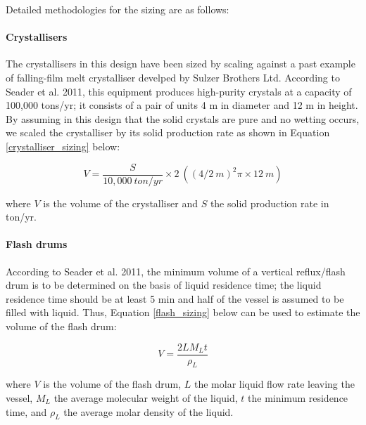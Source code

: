 Detailed methodologies for the sizing are as follows:

\paragraph{Crystallisers}
The crystallisers in this design have been sized by scaling against a past example of falling-film melt crystalliser develped by Sulzer Brothers Ltd. According to Seader et al. 2011, \cite{seader_separation_2011} this equipment produces high-purity crystals at a capacity of 100,000 tons/yr; it consists of a pair of units 4 m in diameter and 12 m in height. By assuming in this design that the solid crystals are pure and no wetting occurs, we scaled the crystalliser by its solid production rate as shown in Equation \ref{crystalliser_sizing} below:

\begin{equation}
    V = \frac{S}{10,000~ton/yr} \times 2~((4/2~m)^2 \pi \times 12~m)
    \label{crystalliser_sizing}
\end{equation}

where $V$ is the volume of the crystalliser and $S$ the solid production rate in ton/yr. 

\paragraph{Flash drums}
According to Seader et al. 2011, \cite{seader_separation_2011} the minimum volume of a vertical reflux/flash drum is to be determined on the basis of liquid residence time; the liquid residence time should be at least 5 min and half of the vessel is assumed to be filled with liquid. Thus, Equation \ref{flash_sizing} below can be used to estimate the volume of the flash drum:

\begin{equation}
    V = \frac{2 L M_L t}{\rho_{L}}
    \label{flash_sizing}
\end{equation}

where $V$ is the volume of the flash drum, $L$ the molar liquid flow rate leaving the vessel, $M_L$ the average molecular weight of the liquid, $t$ the minimum residence time, and $\rho_L$ the average molar density of the liquid. 